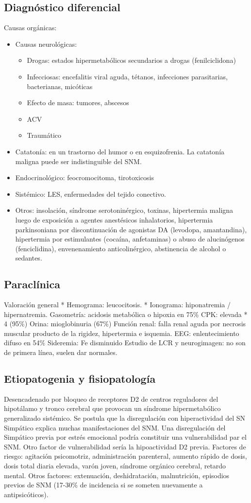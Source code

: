 \subsection*{Diagnóstico diferencial}
Causas orgánicas:
\begin{itemize}
	\item Causas neurológicas:
	\begin{itemize}
		\item Drogas: estados hipermetabólicos secundarios a drogas (fenilciclidona)
		\item Infecciosas: encefalitis viral aguda, tétanos, infecciones parasitarias, bacterianas, micóticas
		\item Efecto de masa: tumores, abscesos
		\item ACV
		\item Traumático
	\end{itemize}
	\item Catatonía: en un trastorno del humor o en esquizofrenia. La catatonía maligna puede ser indistinguible del SNM.
	\item Endocrinológico: feocromocitoma, tirotoxicosis
	\item Sistémico: LES, enfermedades del tejido conectivo.
	\item Otros: insolación, síndrome serotoninérgico, toxinas, hipertermia maligna luego de exposición a agentes anestésicos inhalatorios, hipertermia parkinsoniana por discontinuación de agonistas DA (levodopa, amantandina), hipertermia por estimulantes (cocaína, anfetaminas) o abuso de alucinógenos (fenciclidina), envenenamiento anticolinérgico, abstinencia de alcohol o sedantes.
\end{itemize}
\subsection*{Paraclínica}
Valoración general
* Hemograma: leucocitosis.
* Ionograma: hiponatremia / hipernatremia.
Gasometría: acidosis metabólica o hipoxia en 75\%
CPK: elevada * 4 (95\%)
Orina: mioglobinuria (67\%)
Función renal: falla renal aguda por necrosis muscular producto de la rigidez, hipertermia e isquemia.
EEG: enlentecimiento difuso en 54\%
Sideremia: Fe disminuido
Estudio de LCR y neurogimagen: no son de primera línea, suelen dar normales.
\subsection*{Etiopatogenia y fisiopatología}
Desencadenado por bloqueo de receptores D2 de centros reguladores del hipotálamo y tronco cerebral que provocan un síndrome hipermetabólico generalizado sistémico. Se postula que la disregulación con hiperactividad del SN Simpático explica muchas manifestaciones del SNM. 
Una disregulación del Simpático previa por estrés emocional podría constituir una vulnerabilidad par el SNM. Otro factor de vulnerabilidad sería la hipoactividad D2 previa.
Factores de riesgo: agitación psicomotriz, administración parenteral, aumento rápido de dosis, dosis total diaria elevada, varón joven, síndrome orgánico cerebral, retardo mental.
Otros factores: extenuación, deshidratación, malnutrición, episodios previos de SNM (17-30\% de incidencia si se someten nuevamente a antipsicóticos).
